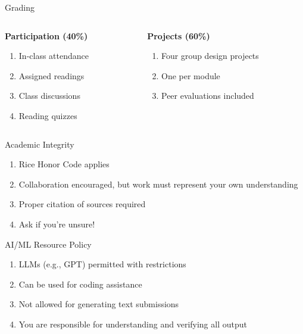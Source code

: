 \documentclass[
  ignorenonframetext,
]{beamer}
\providecommand{\tightlist}{%
  \setlength{\itemsep}{0pt}\setlength{\parskip}{0pt}}\usepackage{longtable,booktabs,array}
\begin{document}
\begin{frame}{Grading}
\label{grading}
\begin{columns}[T]
\begin{column}{0.5\textwidth}
\textbf{Participation (40\%)}

\begin{enumerate}
\tightlist
\item
  In-class attendance
\item
  Assigned readings
\item
  Class discussions
\item
  Reading quizzes
\end{enumerate}
\end{column}

\begin{column}{0.5\textwidth}
\textbf{Projects (60\%)}

\begin{enumerate}
\tightlist
\item
  Four group design projects
\item
  One per module
\item
  Peer evaluations included
\end{enumerate}
\end{column}
\end{columns}
\end{frame}

\begin{frame}{Academic Integrity}
\label{academic-integrity}
\begin{enumerate}
\tightlist
\item
  Rice Honor Code applies
\item
  Collaboration encouraged, but work must represent your own
  understanding
\item
  Proper citation of sources required
\item
  Ask if you're unsure!
\end{enumerate}
\end{frame}

\begin{frame}{AI/ML Resource Policy}
\label{aiml-resource-policy}
\begin{enumerate}
\tightlist
\item
  LLMs (e.g., GPT) permitted with restrictions
\item
  Can be used for coding assistance
\item
  Not allowed for generating text submissions
\item
  You are responsible for understanding and verifying all output
\end{enumerate}
\end{frame}
\end{document}
